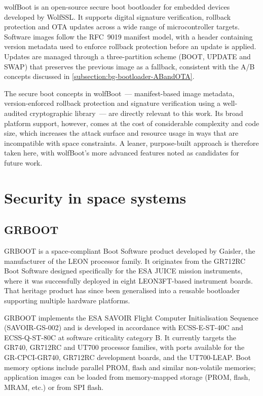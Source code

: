 wolfBoot \cite{wolfBoot} is an open-source secure boot bootloader for embedded devices developed by WolfSSL. It supports digital signature verification, rollback protection and OTA updates across a wide range of microcontroller targets. Software images follow the RFC~9019 \cite{rfc9019} manifest model, with a header containing version metadata used to enforce rollback protection before an update is applied. Updates are managed through a three-partition scheme (BOOT, UPDATE and SWAP) that preserves the previous image as a fallback, consistent with the A/B concepts discussed in \autoref{subsection:bg-bootloader-ABandOTA}.

The secure boot concepts in wolfBoot~--- manifest-based image metadata, version-enforced rollback protection and signature verification using a well-audited cryptographic library~--- are directly relevant to this work. Its broad platform support, however, comes at the cost of considerable complexity and code size, which increases the attack surface and resource usage in ways that are incompatible with space constraints. A leaner, purpose-built approach is therefore taken here, with wolfBoot's more advanced features noted as candidates for future work.

\section{Security in space systems}
\label{section:related-space}

\subsection{GRBOOT}
\label{subsection:related-space-grboot}

GRBOOT \cite{GRBOOT} is a space-compliant Boot Software product developed by Gaisler, the manufacturer of the LEON processor family. It originates from the GR712RC Boot Software designed specifically for the ESA JUICE mission instruments, where it was successfully deployed in eight LEON3FT-based instrument boards. That heritage product has since been generalised into a reusable bootloader supporting multiple hardware platforms.

GRBOOT implements the ESA SAVOIR Flight Computer Initialisation Sequence (SAVOIR-GS-002) and is developed in accordance with ECSS-E-ST-40C and ECSS-Q-ST-80C at software criticality category B. It currently targets the GR740, GR712RC and UT700 processor families, with ports available for the GR-CPCI-GR740, GR712RC development boards, and the UT700-LEAP. Boot memory options include parallel PROM, flash and similar non-volatile memories; application images can be loaded from memory-mapped storage (PROM, flash, MRAM, etc.) or from SPI flash.

